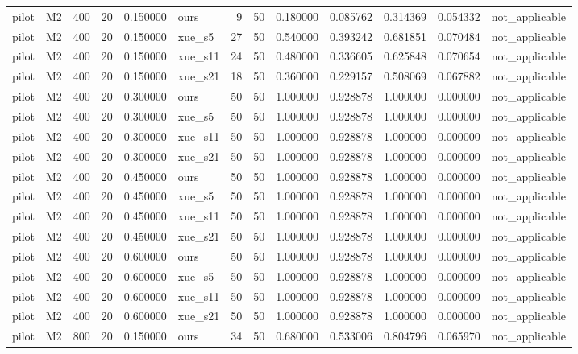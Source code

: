 \begin{longtable}{llrrrlrrrrrrl}
pilot & M2 & 400 & 20 & 0.150000 & ours & 9 & 50 & 0.180000 & 0.085762 & 0.314369 & 0.054332 & not\_applicable \\
pilot & M2 & 400 & 20 & 0.150000 & xue\_s5 & 27 & 50 & 0.540000 & 0.393242 & 0.681851 & 0.070484 & not\_applicable \\
pilot & M2 & 400 & 20 & 0.150000 & xue\_s11 & 24 & 50 & 0.480000 & 0.336605 & 0.625848 & 0.070654 & not\_applicable \\
pilot & M2 & 400 & 20 & 0.150000 & xue\_s21 & 18 & 50 & 0.360000 & 0.229157 & 0.508069 & 0.067882 & not\_applicable \\
pilot & M2 & 400 & 20 & 0.300000 & ours & 50 & 50 & 1.000000 & 0.928878 & 1.000000 & 0.000000 & not\_applicable \\
pilot & M2 & 400 & 20 & 0.300000 & xue\_s5 & 50 & 50 & 1.000000 & 0.928878 & 1.000000 & 0.000000 & not\_applicable \\
pilot & M2 & 400 & 20 & 0.300000 & xue\_s11 & 50 & 50 & 1.000000 & 0.928878 & 1.000000 & 0.000000 & not\_applicable \\
pilot & M2 & 400 & 20 & 0.300000 & xue\_s21 & 50 & 50 & 1.000000 & 0.928878 & 1.000000 & 0.000000 & not\_applicable \\
pilot & M2 & 400 & 20 & 0.450000 & ours & 50 & 50 & 1.000000 & 0.928878 & 1.000000 & 0.000000 & not\_applicable \\
pilot & M2 & 400 & 20 & 0.450000 & xue\_s5 & 50 & 50 & 1.000000 & 0.928878 & 1.000000 & 0.000000 & not\_applicable \\
pilot & M2 & 400 & 20 & 0.450000 & xue\_s11 & 50 & 50 & 1.000000 & 0.928878 & 1.000000 & 0.000000 & not\_applicable \\
pilot & M2 & 400 & 20 & 0.450000 & xue\_s21 & 50 & 50 & 1.000000 & 0.928878 & 1.000000 & 0.000000 & not\_applicable \\
pilot & M2 & 400 & 20 & 0.600000 & ours & 50 & 50 & 1.000000 & 0.928878 & 1.000000 & 0.000000 & not\_applicable \\
pilot & M2 & 400 & 20 & 0.600000 & xue\_s5 & 50 & 50 & 1.000000 & 0.928878 & 1.000000 & 0.000000 & not\_applicable \\
pilot & M2 & 400 & 20 & 0.600000 & xue\_s11 & 50 & 50 & 1.000000 & 0.928878 & 1.000000 & 0.000000 & not\_applicable \\
pilot & M2 & 400 & 20 & 0.600000 & xue\_s21 & 50 & 50 & 1.000000 & 0.928878 & 1.000000 & 0.000000 & not\_applicable \\
pilot & M2 & 800 & 20 & 0.150000 & ours & 34 & 50 & 0.680000 & 0.533006 & 0.804796 & 0.065970 & not\_applicable \\

\end{longtable}
